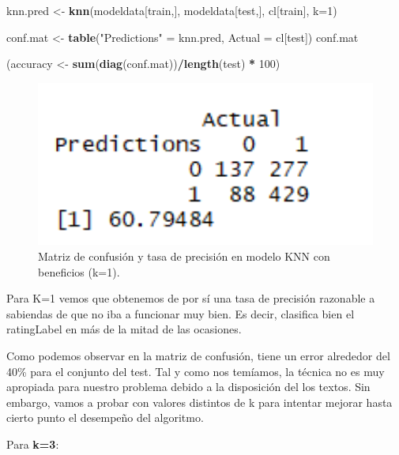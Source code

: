 \documentclass[spanish,]{article}
\newenvironment{Shaded}{\begin{snugshade}}{\end{snugshade}}
\newcommand{\KeywordTok}[1]{\textcolor[rgb]{0.13,0.29,0.53}{\textbf{#1}}}
\newcommand{\DataTypeTok}[1]{\textcolor[rgb]{0.13,0.29,0.53}{#1}}
\newcommand{\DecValTok}[1]{\textcolor[rgb]{0.00,0.00,0.81}{#1}}
\newcommand{\StringTok}[1]{\textcolor[rgb]{0.31,0.60,0.02}{#1}}
\newcommand{\OperatorTok}[1]{\textcolor[rgb]{0.81,0.36,0.00}{\textbf{#1}}}
\newcommand{\NormalTok}[1]{#1}
\begin{document}
\begin{Shaded}
\begin{Highlighting}[]
\NormalTok{knn.pred <-}\StringTok{ }\KeywordTok{knn}\NormalTok{(modeldata[train,], modeldata[test,], cl[train], }\DataTypeTok{k=}\DecValTok{1}\NormalTok{) }

\NormalTok{conf.mat <-}\StringTok{ }\KeywordTok{table}\NormalTok{(}\StringTok{"Predictions"}\NormalTok{ =}\StringTok{ }\NormalTok{knn.pred, }\DataTypeTok{Actual =}\NormalTok{ cl[test])}
\NormalTok{conf.mat}

\NormalTok{(accuracy <-}\StringTok{ }\KeywordTok{sum}\NormalTok{(}\KeywordTok{diag}\NormalTok{(conf.mat))}\OperatorTok{/}\KeywordTok{length}\NormalTok{(test) }\OperatorTok{*}\StringTok{ }\DecValTok{100}\NormalTok{)}
\end{Highlighting}
\end{Shaded}

\begin{figure}[h]
    \centering
    \includegraphics[width=1\textwidth]{figuras/KNN/benefits_k1.png}
    \caption{Matriz de confusión y tasa de precisión en modelo KNN con beneficios (k=1).}
    \label{fig:KNN:benefitsK1}
\end{figure}

Para K=1 vemos que obtenemos de por sí una tasa de precisión razonable a
sabiendas de que no iba a funcionar muy bien. Es decir, clasifica bien
el ratingLabel en más de la mitad de las ocasiones.

Como podemos observar en la matriz de confusión, tiene un error
alrededor del 40\% para el conjunto del test. Tal y como nos temíamos,
la técnica no es muy apropiada para nuestro problema debido a la
disposición del los textos. Sin embargo, vamos a probar con valores
distintos de k para intentar mejorar hasta cierto punto el desempeño del
algoritmo.

Para \textbf{k=3}:
\end{document}
